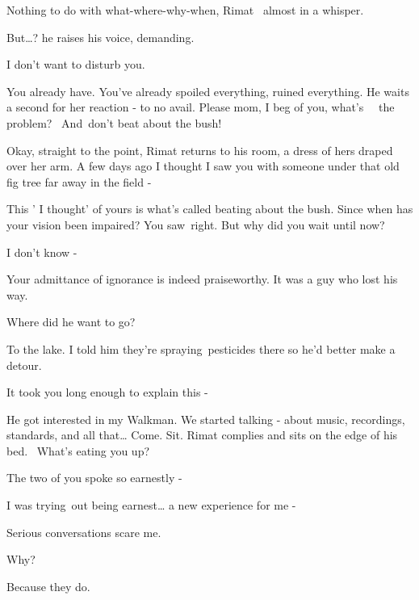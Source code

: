 \documentclass[letterpaper]{article}
\begin{document}
{\textquotedbl}Nothing to do with what-where-why-when,{\textquotedbl} Rimat \ almost in a whisper. 

{\textquotedbl}But{\dots}?{\textquotedbl} he raises his voice, demanding. 

{\textquotedbl}I don't want to disturb you.{\textquotedbl} 

{\textquotedbl}You already have. You've already spoiled everything, ruined everything.{\textquotedbl} He waits a second
for her reaction - to no avail. {\textquotedbl}Please mom, I beg of you, what's \ \ the problem? \ And~don't beat about
the bush!{\textquotedbl} 

{\textquotedbl}Okay, straight to the point,{\textquotedbl} Rimat returns to his room, a dress of hers draped over her
arm. {\textquotedbl}A few days ago I thought I saw you with someone under that old fig tree far away in the field
-{\textquotedbl} 

{\textquotedbl}This ' I thought' of yours is what's called beating about the bush. Since when has your vision been
impaired? You saw~right. But why did you wait until now?{\textquotedbl} 

{\textquotedbl}I don't know -{\textquotedbl} 

{\textquotedbl}Your admittance of ignorance is indeed praiseworthy. It was a guy who lost his way.{\textquotedbl} 

{\textquotedbl}Where did he want to go?{\textquotedbl} 

{\textquotedbl}To the lake. I told him they're spraying~pesticides there so he'd better make a detour.{\textquotedbl} 

{\textquotedbl}It took you long enough to explain this -{\textquotedbl} 

{\textquotedbl}He got interested in my Walkman. We started talking - about music, recordings, standards, and all
that{\dots} Come. Sit.{\textquotedbl} Rimat complies and sits on the edge of his bed.~ {\textquotedbl}What's eating you
up?{\textquotedbl} 

{\textquotedbl}The two of you spoke so earnestly -{\textquotedbl} 

{\textquotedbl}I was trying~out being earnest{\dots} a new experience for me -{\textquotedbl}

{\textquotedbl}Serious conversations scare me.{\textquotedbl} 

{\textquotedbl}Why?{\textquotedbl} 

{\textquotedbl}Because they do.{\textquotedbl} 
\end{document}
